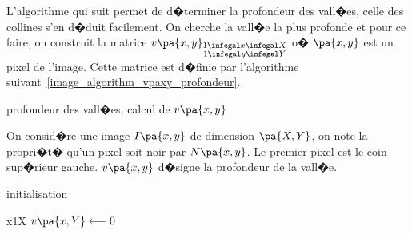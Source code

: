 L'algorithme qui suit permet de d�terminer la profondeur des vall�es, celle des collines s'en d�duit facilement. On cherche la vall�e la plus profonde et pour ce faire, on construit la matrice $v\pa{x,y}_{ \begin{subarray}{c} 1 \infegal x \infegal X \\ 1 \infegal y \infegal Y \end{subarray}}$ o� $\pa{x,y}$ est un pixel de l'image. Cette matrice est d�finie par l'algorithme suivant~\ref{image_algorithm_vpaxy_profondeur}.


        \begin{xalgorithm}{profondeur des vall�es, calcul de
                                                $v\pa{x,y}$
                                                    }
        \label{image_algorithm_vpaxy_profondeur}
        
        On consid�re une image $I\pa{x,y}$ de dimension $\pa{X,Y}$, on note la propri�t� qu'un pixel 
        soit noir par $N\pa{x,y}$. Le premier pixel est le coin sup�rieur gauche.
        $v\pa{x,y}$ d�signe la profondeur de la vall�e.
                
        \begin{xalgostep}{initialisation}
        \begin{xfor}{x}{1}{X}
            $v\pa{x,Y} \longleftarrow 0$ 
        \end{xfor}
        \end{xalgostep}
            

\end{xalgorithm}
